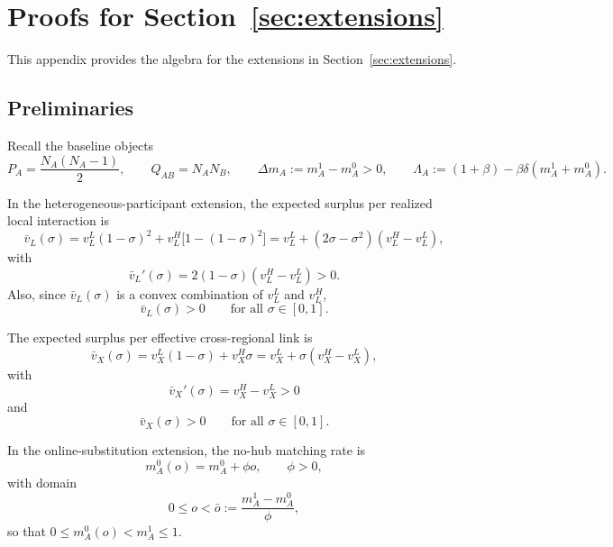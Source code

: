 \section{Proofs for Section~\ref{sec:extensions}}

This appendix provides the algebra for the extensions in Section~\ref{sec:extensions}.

\subsection{Preliminaries}

Recall the baseline objects
\[
P_A=\frac{N_A(N_A-1)}{2},
\qquad
Q_{AB}=N_AN_B,
\qquad
\Delta m_A:=m_A^1-m_A^0>0,
\qquad
\Lambda_A:=(1+\beta)-\beta\delta(m_A^1+m_A^0).
\]

In the heterogeneous-participant extension, the expected surplus per realized local interaction is
\begin{equation}
\bar v_L(\sigma)
=
v_L^L(1-\sigma)^2
+
v_L^H\bigl[1-(1-\sigma)^2\bigr]
=
v_L^L+(2\sigma-\sigma^2)(v_L^H-v_L^L),
\label{eq:app7_vbarL_sigma}
\end{equation}
with
\begin{equation}
\bar v_L'(\sigma)=2(1-\sigma)(v_L^H-v_L^L)>0.
\label{eq:app7_vbarL_prime}
\end{equation}
Also, since $\bar v_L(\sigma)$ is a convex combination of $v_L^L$ and $v_L^H$,
\begin{equation}
\bar v_L(\sigma)>0
\qquad
\text{for all }\sigma\in[0,1].
\label{eq:app7_vbarL_positive}
\end{equation}

The expected surplus per effective cross-regional link is
\begin{equation}
\bar v_X(\sigma)
=
v_X^L(1-\sigma)+v_X^H\sigma
=
v_X^L+\sigma(v_X^H-v_X^L),
\label{eq:app7_vbarX_sigma}
\end{equation}
with
\begin{equation}
\bar v_X'(\sigma)=v_X^H-v_X^L>0
\label{eq:app7_vbarX_prime}
\end{equation}
and
\begin{equation}
\bar v_X(\sigma)>0
\qquad
\text{for all }\sigma\in[0,1].
\label{eq:app7_vbarX_positive}
\end{equation}

In the online-substitution extension, the no-hub matching rate is
\begin{equation}
m_A^0(o)=m_A^0+\phi o,
\qquad
\phi>0,
\label{eq:app7_m0o}
\end{equation}
with domain
\begin{equation}
0\le o<\bar o:=\frac{m_A^1-m_A^0}{\phi},
\label{eq:app7_o_domain}
\end{equation}
so that $0\le m_A^0(o)<m_A^1\le 1$.

